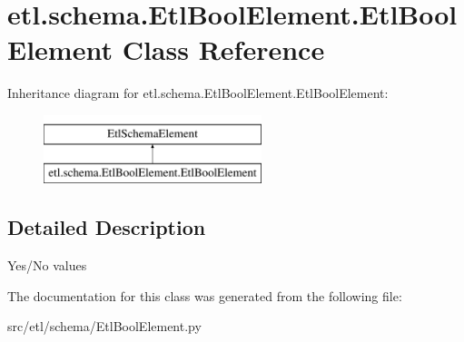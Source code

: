 \hypertarget{classetl_1_1schema_1_1EtlBoolElement_1_1EtlBoolElement}{\section{etl.\-schema.\-Etl\-Bool\-Element.\-Etl\-Bool\-Element Class Reference}
\label{classetl_1_1schema_1_1EtlBoolElement_1_1EtlBoolElement}
}
Inheritance diagram for etl.\-schema.\-Etl\-Bool\-Element.\-Etl\-Bool\-Element\-:\begin{figure}[H]
\begin{center}
\leavevmode
\includegraphics[height=2.000000cm]{classetl_1_1schema_1_1EtlBoolElement_1_1EtlBoolElement}
\end{center}
\end{figure}


\subsection{Detailed Description}
\begin{DoxyVerb}Yes/No values\end{DoxyVerb}
 

The documentation for this class was generated from the following file\-:\begin{DoxyCompactItemize}
\item 
src/etl/schema/Etl\-Bool\-Element.\-py\end{DoxyCompactItemize}
